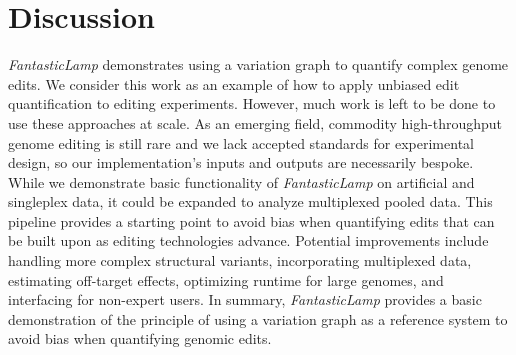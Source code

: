 \documentclass{bioinfo}
\theoremstyle{definition}
\begin{document}
\section*{Discussion}
\label{sec:discussion}
\textit{FantasticLamp} demonstrates using a variation graph to quantify complex genome edits.
We consider this work as an example of how to apply unbiased edit quantification to editing experiments.
However, much work is left to be done to use these approaches at scale.
As an emerging field, commodity high-throughput genome editing is still rare and we lack accepted standards for experimental design, so our implementation's inputs and outputs are necessarily bespoke.
While we demonstrate basic functionality of \textit{FantasticLamp} on artificial and singleplex data, it could be expanded to analyze multiplexed pooled data.
This pipeline provides a starting point to avoid bias when quantifying edits that can be built upon as editing technologies advance.
Potential improvements include handling more complex structural variants, incorporating multiplexed data, estimating off-target effects, optimizing runtime for large genomes, and interfacing for non-expert users.
In summary, \textit{FantasticLamp} provides a basic demonstration of the principle of using a variation graph as a reference system to avoid bias when quantifying genomic edits.

\end{document}
